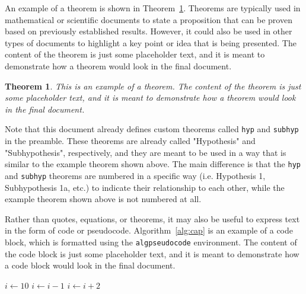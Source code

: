 An example of a theorem is shown in Theorem~\ref{thm:exampleKey}. Theorems are typically used in mathematical or scientific documents to state a proposition that can be proven based on previously established results. However, it could also be used in other types of documents to highlight a key point or idea that is being presented. The content of the theorem is just some placeholder text, and it is meant to demonstrate how a theorem would look in the final document. 

\newtheorem{thm:example}{Theorem}
\begin{thm:example}
	\label{thm:exampleKey}
	This is an example of a theorem. The content of the theorem is just some placeholder text, and it is meant to demonstrate how a theorem would look in the final document.
\end{thm:example}

Note that this document already defines custom theorems called \texttt{hyp} and \texttt{subhyp} in the preamble. These theorems are already called "Hypothesis" and "Subhypothesis", respectively, and they are meant to be used in a way that is similar to the example theorem shown above. The main difference is that the \texttt{hyp} and \texttt{subhyp} theorems are numbered in a specific way (i.e. Hypothesis 1, Subhypothesis 1a, etc.) to indicate their relationship to each other, while the example theorem shown above is not numbered at all.

Rather than quotes, equations, or theorems, it may also be useful to express text in the form of code or pseudocode. Algorithm~\ref{alg:cap} is an example of a code block, which is formatted using the \texttt{algpseudocode} environment. The content of the code block is just some placeholder text, and it is meant to demonstrate how a code block would look in the final document.

\begin{algorithm}[tbp]
	\caption{An algorithm with caption}\label{alg:cap}
	\begin{algorithmic}[1]
		\State $i\gets 10$
		\State $i\gets i-1$
		\Else
			\State $i\gets i+2$
		\EndIf
		\EndIf
	\end{algorithmic}
\end{algorithm}
